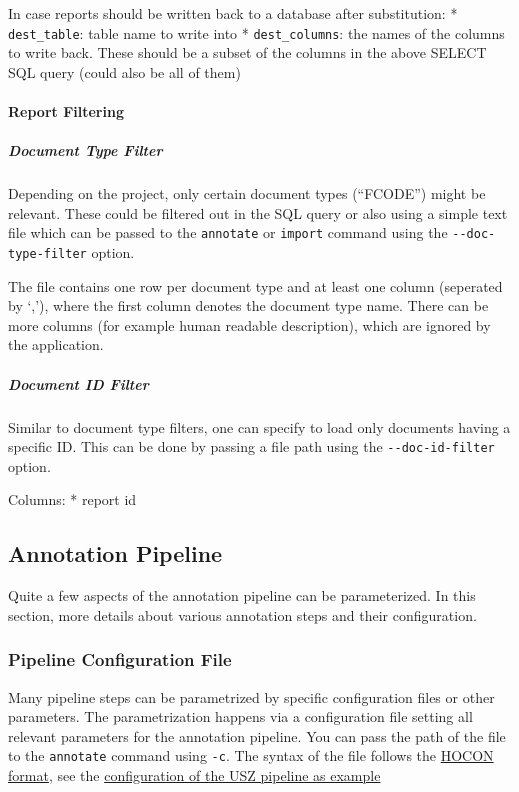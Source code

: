 In case reports should be written back to a database after substitution:
* \texttt{dest\_table}: table name to write into *
\texttt{dest\_columns}: the names of the columns to write back. These
should be a subset of the columns in the above SELECT SQL query (could
also be all of them)

\paragraph{Report Filtering}\label{report-filtering}

\subparagraph{Document Type Filter}\label{document-type-filter}

Depending on the project, only certain document types (``FCODE'') might
be relevant. These could be filtered out in the SQL query or also using
a simple text file which can be passed to the \texttt{annotate} or
\texttt{import} command using the \texttt{-\/-doc-type-filter} option.

The file contains one row per document type and at least one column
(seperated by `,'), where the first column denotes the document type
name. There can be more columns (for example human readable
description), which are ignored by the application.

\subparagraph{Document ID Filter}\label{document-id-filter}

Similar to document type filters, one can specify to load only documents
having a specific ID. This can be done by passing a file path using the
\texttt{-\/-doc-id-filter} option.

Columns: * report id

\subsection{Annotation Pipeline}\label{annotation-pipeline}

Quite a few aspects of the annotation pipeline can be parameterized. In
this section, more details about various annotation steps and their
configuration.

\subsubsection{Pipeline Configuration
File}\label{pipeline-configuration-file}

Many pipeline steps can be parametrized by specific configuration files
or other parameters. The parametrization happens via a configuration
file setting all relevant parameters for the annotation pipeline. You
can pass the path of the file to the \texttt{annotate} command using
\texttt{-c}. The syntax of the file follows the
\href{https://github.com/lightbend/config}{HOCON format}, see the
\href{https://github.com/ratschlab/medical-reports-deidentification/blob/main/configs/kisim-usz/kisim_usz.conf}{configuration of the USZ
pipeline as example}

